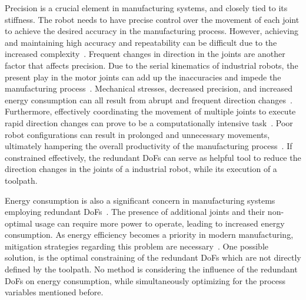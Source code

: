 Precision is a crucial element in manufacturing systems, and closely tied to its stiffness. The robot needs to have precise control over the movement of each joint to achieve the desired accuracy in the manufacturing process. However, achieving and maintaining high accuracy and repeatability can be difficult due to the increased complexity~\cite{Duong.2021}. %
Frequent changes in direction in the joints are another factor that affects precision. 
Due to the serial kinematics of industrial robots, the present play in the motor joints can add up the inaccuracies and impede the manufacturing process~\cite{Huynh.2020, ChenGang.2014}. Mechanical stresses, decreased precision, and increased energy consumption can all result from abrupt and frequent direction changes~\cite{Gasparetto.2010}. Furthermore, effectively coordinating the movement of multiple joints to execute rapid direction changes can prove to be a computationally intensive task~\cite{VandeWeghe.2007}. Poor robot configurations can result in prolonged and unnecessary movements, ultimately hampering the overall productivity of the manufacturing process~\cite{Reiter.2016}. %
If constrained effectively, the redundant \acrshort{DoF}s can serve as helpful tool to reduce the direction changes in the joints of a industrial robot, while its execution of a toolpath. 




Energy consumption is also a significant concern in manufacturing systems employing redundant \acrshort{DoF}s~\cite{Doan.2016}. The presence of additional joints and their non-optimal usage can require more power to operate, leading to increased energy consumption. As energy efficiency becomes a priority in modern manufacturing, mitigation strategies regarding this problem are necessary~\cite{Boscariol.2020, Boscariol.2019}. One possible solution, is the optimal constraining of the redundant \acrshort{DoF}s which are not directly defined by the toolpath. No method is considering the influence of the redundant \acrshort{DoF}s on energy consumption, while simultaneously optimizing for the process variables mentioned before.

